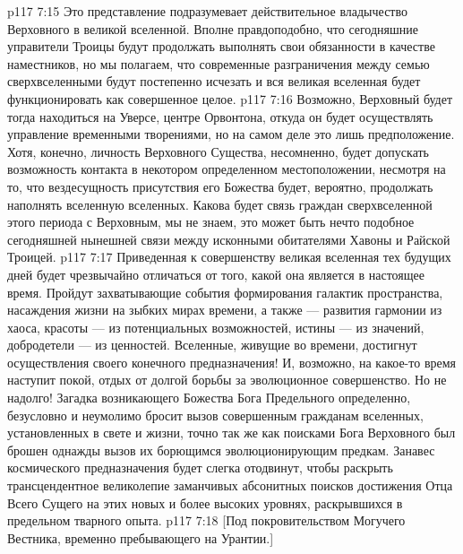 \vs p117 7:15 Это представление подразумевает действительное владычество Верховного в великой вселенной. Вполне правдоподобно, что сегодняшние управители Троицы будут продолжать выполнять свои обязанности в качестве наместников, но мы полагаем, что современные разграничения между семью сверхвселенными будут постепенно исчезать и вся великая вселенная будет функционировать как совершенное целое.
\vs p117 7:16 Возможно, Верховный будет тогда находиться на Уверсе, центре Орвонтона, откуда он будет осуществлять управление временными творениями, но на самом деле это лишь предположение. Хотя, конечно, личность Верховного Существа, несомненно, будет допускать возможность контакта в некотором определенном местоположении, несмотря на то, что вездесущность присутствия его Божества будет, вероятно, продолжать наполнять вселенную вселенных. Какова будет связь граждан сверхвселенной этого периода с Верховным, мы не знаем, это может быть нечто подобное сегодняшней нынешней связи между исконными обитателями Хавоны и Райской Троицей.
\vs p117 7:17 \pc Приведенная к совершенству великая вселенная тех будущих дней будет чрезвычайно отличаться от того, какой она является в настоящее время. Пройдут захватывающие события формирования галактик пространства, насаждения жизни на зыбких мирах времени, а также --- развития гармонии из хаоса, красоты --- из потенциальных возможностей, истины --- из значений, добродетели --- из ценностей. Вселенные, живущие во времени, достигнут осуществления своего конечного предназначения! И, возможно, на какое\hyp{}то время наступит покой, отдых от долгой борьбы за эволюционное совершенство. Но не надолго! Загадка возникающего Божества Бога Предельного определенно, безусловно и неумолимо бросит вызов совершенным гражданам вселенных, установленных в свете и жизни, точно так же как поисками Бога Верховного был брошен однажды вызов их борющимся эволюционирующим предкам. Занавес космического предназначения будет слегка отодвинут, чтобы раскрыть трансцендентное великолепие заманчивых абсонитных поисков достижения Отца Всего Сущего на этих новых и более высоких уровнях, раскрывшихся в предельном тварного опыта.
\vsetoff
\vs p117 7:18 [Под покровительством Могучего Вестника, временно пребывающего на Урантии.]
